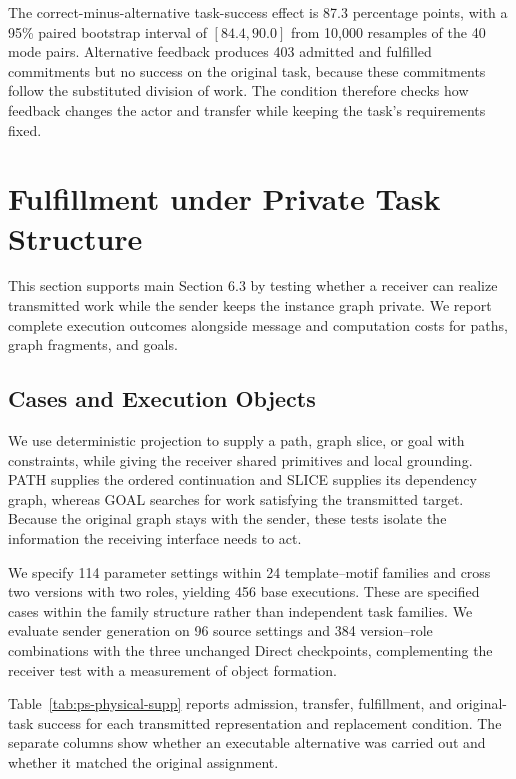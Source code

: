 \documentclass[sigconf,nonacm,balance=false]{aamas}
\begin{document}
The correct-minus-alternative task-success effect is 87.3 percentage points, with a 95\% paired bootstrap interval of $[84.4,90.0]$ from 10,000 resamples of the 40 mode pairs. Alternative feedback produces 403 admitted and fulfilled commitments but no success on the original task, because these commitments follow the substituted division of work. The condition therefore checks how feedback changes the actor and transfer while keeping the task's requirements fixed.

\section{Fulfillment under Private Task Structure}
\label{sec:supp-private-structure}

This section supports main Section 6.3 by testing whether a receiver can realize transmitted work while the sender keeps the instance graph private. We report complete execution outcomes alongside message and computation costs for paths, graph fragments, and goals.

\subsection{Cases and Execution Objects}
We use deterministic projection to supply a path, graph slice, or goal with constraints, while giving the receiver shared primitives and local grounding. PATH supplies the ordered continuation and SLICE supplies its dependency graph, whereas GOAL searches for work satisfying the transmitted target. Because the original graph stays with the sender, these tests isolate the information the receiving interface needs to act.

We specify 114 parameter settings within 24 template--motif families and cross two versions with two roles, yielding 456 base executions. These are specified cases within the family structure rather than independent task families. We evaluate sender generation on 96 source settings and 384 version--role combinations with the three unchanged Direct checkpoints, complementing the receiver test with a measurement of object formation.

Table~\ref{tab:ps-physical-supp} reports admission, transfer, fulfillment, and original-task success for each transmitted representation and replacement condition. The separate columns show whether an executable alternative was carried out and whether it matched the original assignment.
\end{document}
